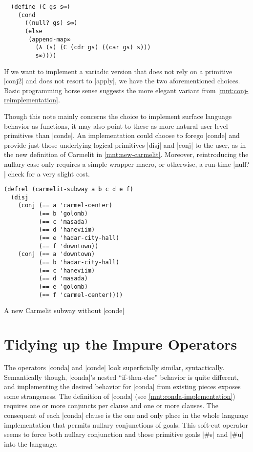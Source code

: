 \documentclass[sigplan,draft,natbib=false]{acmart}
\begin{document}
\begin{verbatim}
  (define (C gs s∞)
    (cond
      ((null? gs) s∞)
      (else
       (append-map∞
         (λ (s) (C (cdr gs) ((car gs) s)))
         s∞))))
\end{verbatim}

If we want to implement a variadic version that does not rely on a
primitive \rackinline|conj2| and does not resort to
\rackinline|apply|, we have the two aforementioned choices. Basic
programming horse sense suggests the more elegant variant from
\cref{mnt:conj-reimplementation}.

Though this note mainly concerns the choice to implement surface
language behavior as functions, it may also point to these as more
natural user-level primitives than \rackinline|conde|. An
implementation could choose to forego \rackinline|conde| and provide
just those underlying logical primitives \rackinline|disj| and
\rackinline|conj| to the user, as in the new definition of Carmelit in
\cref{mnt:new-carmelit}. Moreover, reintroducing the nullary case only
requires a simple wrapper macro, or otherwise, a run-time
\rackinline|null?| check for a very slight cost.

\begin{listing}
  \begin{verbatim}
(defrel (carmelit-subway a b c d e f)
  (disj
    (conj (== a 'carmel-center)
          (== b 'golomb)
          (== c 'masada)
          (== d 'haneviim)
          (== e 'hadar-city-hall)
          (== f 'downtown))
    (conj (== a 'downtown)
          (== b 'hadar-city-hall)
          (== c 'haneviim)
          (== d 'masada)
          (== e 'golomb)
          (== f 'carmel-center))))
  \end{verbatim}
  \caption{A new Carmelit subway without \rackinline|conde|}
  \label{mnt:new-carmelit}
\end{listing}

\section{Tidying up the Impure Operators}\label{sec:impure}

The operators \rackinline|conda| and \rackinline|conde| look
superficially similar, syntactically. Semantically though,
\rackinline|conda|'s nested \enquote{if-then-else} behavior is quite
different, and implementing the desired behavior for
\rackinline|conda| from existing pieces exposes some strangeness. The
definition of \rackinline|conda| (see \cref{mnt:conda-implementation})
requires one or more conjuncts per clause and one or more clauses. The
consequent of each \rackinline|conda| clause is the one and only place
in the whole language implementation that permits nullary conjunctions
of goals. This soft-cut operator seems to force both nullary
conjunction and those primitive goals \rackinline|#s| and
\rackinline|#u| into the language.
\end{document}
